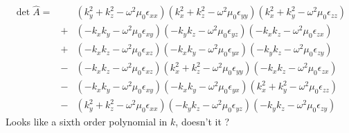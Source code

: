 \documentclass[12pt,a4paper,twoside,openright,BCOR10mm,headsepline,titlepage,abstracton,chapterprefix,final]{scrreprt}
\newcommand\vacuum{0}
\newcommand\wavenumber{k}
\newcommand\vacuumpermeability{\mu_{\vacuum}}
\newcommand\scalarpermittivity{\epsilon}
\begin{document}
\begin{eqnarray}
 \det \hat{A} =&& 
     (   \wavenumber_y^2 + \wavenumber_z^2 - \omega^2 \vacuumpermeability \scalarpermittivity_{xx} )
     (   \wavenumber_x^2 + \wavenumber_z^2 - \omega^2 \vacuumpermeability \scalarpermittivity_{yy} )
     (   \wavenumber_x^2 + \wavenumber_y^2 - \omega^2 \vacuumpermeability \scalarpermittivity_{zz} )
 \nonumber\\&+&
     ( - \wavenumber_x \wavenumber_y - \omega^2 \vacuumpermeability \scalarpermittivity_{xy} )
     ( - \wavenumber_y \wavenumber_z - \omega^2 \vacuumpermeability \scalarpermittivity_{yz} )
     ( - \wavenumber_x \wavenumber_z - \omega^2 \vacuumpermeability \scalarpermittivity_{zx} )
 \nonumber\\&+&
     ( - \wavenumber_x \wavenumber_z - \omega^2 \vacuumpermeability \scalarpermittivity_{xz} )
     ( - \wavenumber_x \wavenumber_y - \omega^2 \vacuumpermeability \scalarpermittivity_{yx} )
     ( - \wavenumber_y \wavenumber_z - \omega^2 \vacuumpermeability \scalarpermittivity_{zy} )
 \nonumber\\&-&    
     ( - \wavenumber_x \wavenumber_z - \omega^2 \vacuumpermeability \scalarpermittivity_{xz} )     
     (   \wavenumber_x^2 + \wavenumber_z^2 - \omega^2 \vacuumpermeability \scalarpermittivity_{yy} )    
     ( - \wavenumber_x \wavenumber_z - \omega^2 \vacuumpermeability \scalarpermittivity_{zx} )
 \nonumber\\&-&
     ( - \wavenumber_x \wavenumber_y - \omega^2 \vacuumpermeability \scalarpermittivity_{xy} )
     ( - \wavenumber_x \wavenumber_y - \omega^2 \vacuumpermeability \scalarpermittivity_{yx} )
     (   \wavenumber_x^2 + \wavenumber_y^2 - \omega^2 \vacuumpermeability \scalarpermittivity_{zz} )
 \nonumber\\&-&
     (   \wavenumber_y^2 + \wavenumber_z^2 - \omega^2 \vacuumpermeability \scalarpermittivity_{xx} )
     ( - \wavenumber_y \wavenumber_z - \omega^2 \vacuumpermeability \scalarpermittivity_{yz} )
     ( - \wavenumber_y \wavenumber_z - \omega^2 \vacuumpermeability \scalarpermittivity_{zy} )
\end{eqnarray}
Looks like a sixth order polynomial in $\wavenumber$, doesn't it ?
\end{document}
